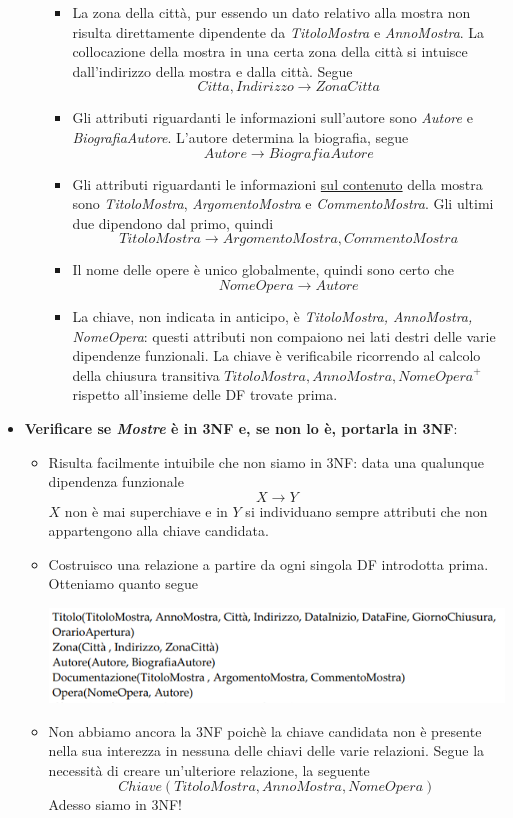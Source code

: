 \begin{itemize}
\begin{itemize}
\begin{itemize}
			\item La zona della città, pur essendo un dato relativo alla mostra non risulta direttamente dipendente da \emph{TitoloMostra} e \emph{AnnoMostra}. La collocazione della mostra in una certa zona della città si intuisce dall'indirizzo della mostra e dalla città. Segue
			\[Citta, Indirizzo \to ZonaCitta\]
			\item Gli attributi riguardanti le informazioni sull'autore sono \emph{Autore} e \emph{BiografiaAutore}. L'autore determina la biografia, segue
			\[Autore \to BiografiaAutore\]
			\item Gli attributi riguardanti le informazioni \underline{sul contenuto} della mostra sono \emph{TitoloMostra}, \emph{ArgomentoMostra} e \emph{CommentoMostra}. Gli ultimi due dipendono dal primo, quindi
			\[TitoloMostra \to ArgomentoMostra, CommentoMostra\]
			\item Il nome delle opere è unico globalmente, quindi sono certo che
			\[NomeOpera \to Autore\]
			\item La chiave, non indicata in anticipo, è \emph{TitoloMostra, AnnoMostra, NomeOpera}: questi attributi non compaiono nei lati destri delle varie dipendenze funzionali. La chiave è verificabile ricorrendo al calcolo della chiusura transitiva ${TitoloMostra, AnnoMostra, NomeOpera}^{+}$ rispetto all'insieme delle DF trovate prima.
		\end{itemize}
	\end{itemize}
	\item \textbf{Verificare se \emph{Mostre} è in 3NF e, se non lo è, portarla in 3NF}:
	\begin{itemize}
		\item Risulta facilmente intuibile che non siamo in 3NF: data una qualunque dipendenza funzionale
		\[X \to Y\]
		$X$ non è mai superchiave e in $Y$ si individuano sempre attributi che non appartengono alla chiave candidata.
		\item Costruisco una relazione a partire da ogni singola DF introdotta prima. Otteniamo quanto segue
		\begin{center}
			\includegraphics{images/227.PNG}
		\end{center}
		\item Non abbiamo ancora la 3NF poichè la chiave candidata non è presente nella sua interezza in nessuna delle chiavi delle varie relazioni. Segue la necessità di creare un'ulteriore relazione, la seguente
		\[Chiave(TitoloMostra,AnnoMostra,NomeOpera)\]
		Adesso siamo in 3NF!
	\end{itemize}
\end{itemize}
